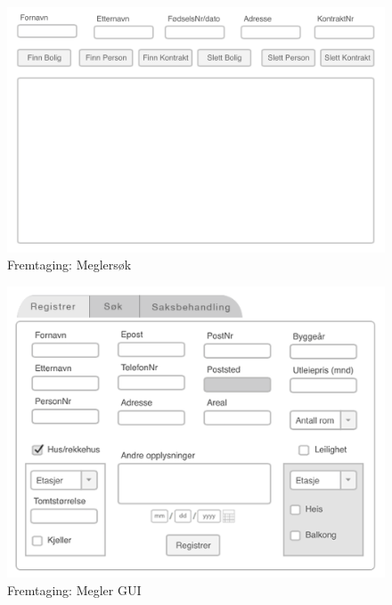 \begin{figure}[ht]
\center
 \includegraphics[scale=0.5]{./img/appendix/gui_forslag/rev_1/Meglersok.png}
 \caption{Fremtaging: Meglersøk}
 \label{fig:DEV:meglersok}
\end{figure}


\begin{figure}[ht]
\center
 \includegraphics[scale=0.5]{./img/appendix/gui_forslag/rev_1/MeglerGUI.png}
 \caption{Fremtaging: Megler GUI}
 \label{fig:DEV:meglerGUI}
\end{figure}

